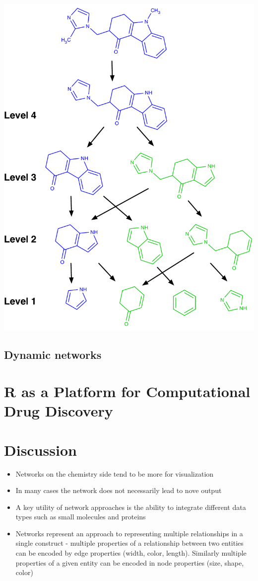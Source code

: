 \documentclass[12pt,letterpaper]{article}
\begin{document}
{}
{\includegraphics[width=0.75\linewidth]{img/scaffold-network}}

\subsection{Dynamic networks}
\label{sec:dynamic-networks}


\section{R as a Platform for Computational Drug Discovery}
\label{sec:r-as-platform}

\section{Discussion}
\label{sec:summary}

\begin{itemize}
\item Networks on the chemistry side tend to be more for visualization
\item In many cases the network does not necessarily lead to nove output
\item A key utility of network approaches is the ability to integrate
  different data types such as small molecules and proteins
\item Networks represent an approach to representing multiple
  relationships in a single construct - multiple properties of a
  relationship between two entities can be encoded by edge properties
  (width, color, length). Similarly multiple properties of a given
  entity can be encoded in node properties (size, shape, color) 
\end{itemize}

\end{document}
